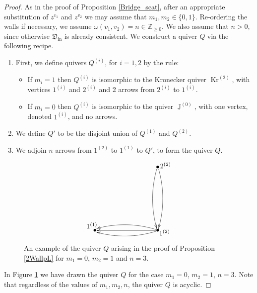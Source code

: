 \documentclass{amsart}
\DeclareMathOperator{\moLQ}{J}
\DeclareMathOperator{\moKr}{Kr}
\newcommand{\Kr}[1]{\moKr^{(#1)}}
\newcommand{\LQ}[1]{\moLQ^{(#1)}}
\DeclareMathOperator{\In}{in}
\let\f=\mathfrak
\theoremstyle{plain}%
\theoremstyle{definition}
\theoremstyle{remark}
\begin{document}
\begin{proof}
As in the proof of Proposition \ref{Bridge_scat}, after an appropriate substitution of $z^{v_1}$ and $z^{v_2}$ we may assume that $m_1,m_2\in \{0,1\}$.  Re-ordering the walls if necessary, we assume $\omega(v_1,v_2)=n\in\mathbb{Z}_{\geq 0}$.  We also assume that $n>0$, since otherwise $\f{D}_{\In}$ is already consistent.  We construct a quiver $Q$ via the following recipe.
\begin{enumerate}
    \item First, we define quivers $Q^{(i)}$, for $i=1,2$ by the rule:
    \begin{itemize}
        \item If $m_i=1$ then $Q^{(i)}$ is isomorphic to the Kronecker quiver $\Kr{2}$, with vertices $1^{(i)}$ and $2^{(i)}$ and 2 arrows from $2^{(i)}$ to $1^{(i)}$.
        \item If $m_i=0$ then $Q^{(i)}$ is isomorphic to the quiver $\LQ{0}$, with one vertex, denoted $1^{(i)}$, and no arrows.
    \end{itemize}
    \item We define $Q'$ to be the disjoint union of $Q^{(1)}$ and $Q^{(2)}$.
    \item We adjoin $n$ arrows from $1^{(2)}$ to $1^{(1)}$ to $Q'$, to form the quiver $Q$.
\end{enumerate}

\begin{figure}[ht]
\[
\xy
{\ar (15,0); (-15,0)};
{\ar@/^.50pc/ (15,-0.5); (-15,-1)};
{\ar@/_.50pc/ (15,0.5); (-15,1)};
{\ar@/_.50pc/ (15.5,31); (15.5,1)};
{\ar@/^.50pc/ (16.5,31); (16.5,1)};
(-16,0)*{\bullet};
(16,0)*{\bullet};
(16,32)*{\bullet};
(19.5,-1)*{1^{(2)}};
(20,33)*{2^{(2)}};
(-17.5,2.5)*{1^{(1)}}
\endxy
\]
\caption[]{An example of the quiver $Q$ arising in the proof of Proposition \ref{2WallpL} for $m_1=0$, $m_2=1$ and $n=3$.}
\label{example_quiver}
\end{figure} 


In Figure \ref{example_quiver} we have drawn the quiver $Q$ for the case $m_1=0$, $m_2=1$, $n=3$.  Note that regardless of the values of $m_1,m_2,n$, the quiver $Q$ is acyclic.  


\end{proof}
\end{document}
